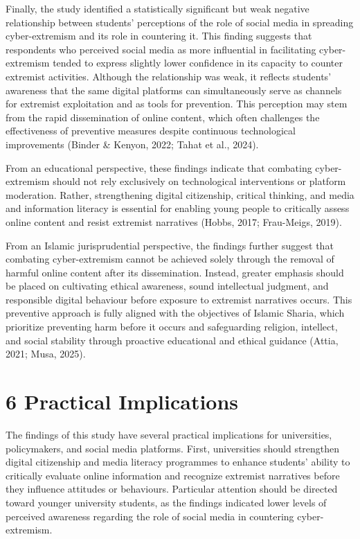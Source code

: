 \documentclass[10pt]{NSP1}
\begin{document}
	Finally, the study identified a statistically significant but weak negative relationship between students' perceptions of the role of social media in spreading cyber-extremism and its role in countering it. This finding suggests that respondents who perceived social media as more influential in facilitating cyber-extremism tended to express slightly lower confidence in its capacity to counter extremist activities. Although the relationship was weak, it reflects students' awareness that the same digital platforms can simultaneously serve as channels for extremist exploitation and as tools for prevention. This perception may stem from the rapid dissemination of online content, which often challenges the effectiveness of preventive measures despite continuous technological improvements (Binder \& Kenyon, 2022; Tahat et al., 2024).
	
	From an educational perspective, these findings indicate that combating cyber-extremism should not rely exclusively on technological interventions or platform moderation. Rather, strengthening digital citizenship, critical thinking, and media and information literacy is essential for enabling young people to critically assess online content and resist extremist narratives (Hobbs, 2017; Frau-Meigs, 2019).
	
	From an Islamic jurisprudential perspective, the findings further suggest that combating cyber-extremism cannot be achieved solely through the removal of harmful online content after its dissemination. Instead, greater emphasis should be placed on cultivating ethical awareness, sound intellectual judgment, and responsible digital behaviour before exposure to extremist narratives occurs. This preventive approach is fully aligned with the objectives of Islamic Sharia, which prioritize preventing harm before it occurs and safeguarding religion, intellect, and social stability through proactive educational and ethical guidance (Attia, 2021; Musa, 2025).
	
	\section*{6 Practical Implications}
	
	The findings of this study have several practical implications for universities, policymakers, and social media platforms. First, universities should strengthen digital citizenship and media literacy programmes to enhance students' ability to critically evaluate online information and recognize extremist narratives before they influence attitudes or behaviours. Particular attention should be directed toward younger university students, as the findings indicated lower levels of perceived awareness regarding the role of social media in countering cyber-extremism.
	
\end{document}
